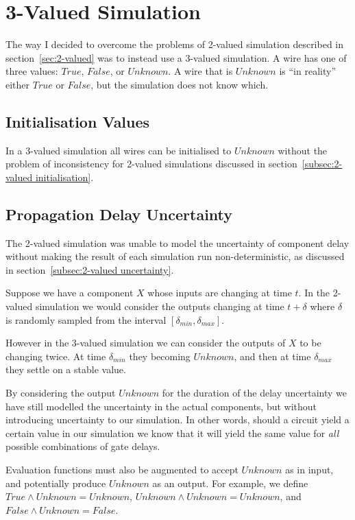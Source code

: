 \section{3-Valued Simulation}
\label{sec:3-valued}
The way I decided to overcome the problems of 2-valued simulation described in section~\ref{sec:2-valued} was to instead use a 3-valued simulation. A wire has one of three values: $True$, $False$, or $Unknown$. A wire that is $Unknown$ is ``in reality'' either $True$ or $False$, but the simulation does not know which.

\subsection{Initialisation Values}
In a 3-valued simulation all wires can be initialised to $Unknown$ without the problem of inconsistency for 2-valued simulations discussed in section~\ref{subsec:2-valued initialisation}.

\subsection{Propagation Delay Uncertainty}
\label{subsec:3-valued uncertainty}
The 2-valued simulation was unable to model the uncertainty of component delay without making the result of each simulation run non-deterministic, as discussed in section~\ref{subsec:2-valued uncertainty}.

Suppose we have a component $X$ whose inputs are changing at time $t$. In the 2-valued simulation we would consider the outputs changing at time $t + \delta$ where $\delta$ is randomly sampled from the interval $[\delta_{min}, \delta_{max}]$. 

However in the 3-valued simulation we can consider the outputs of $X$ to be changing twice. At time $\delta_{min}$ they becoming $Unknown$, and then at time $\delta_{max}$ they settle on a stable value. 

By considering the output $Unknown$ for the duration of the delay uncertainty we have still modelled the uncertainty in the actual components, but without introducing uncertainty to our simulation. In other words, should a circuit yield a certain value in our simulation we know that it will yield the same value for \textit{all} possible combinations of gate delays.

Evaluation functions must also be augmented to accept $Unknown$ as in input, and potentially produce $Unknown$ as an output. For example, we define $True \land Unknown = Unknown$, $Unknown \land Unknown = Unknown$, and $False \land Unknown = False$.

